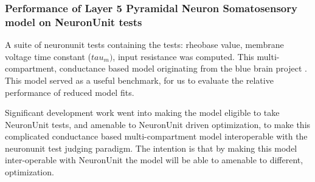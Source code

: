 



%


\subsubsection{Performance of Layer 5 Pyramidal Neuron Somatosensory model on NeuronUnit tests}
\cite{van2016bluepyopt}
A suite of neuronunit tests containing the tests: rheobase value, membrane voltage time constant ($tau_{m})$, input resistance was computed. This multi-compartment, conductance based model originating from the blue brain project \cite{markram2015reconstruction}. This model served as a useful benchmark, for us to evaluate the relative performance of reduced model fits. 


Significant development work went into making the model eligible to take NeuronUnit tests, and amenable to NeuronUnit driven optimization, to make this complicated conductance based multi-compartment model interoperable with the neuronunit test judging paradigm. The intention is that by making this model inter-operable with NeuronUnit the model will be able to amenable to different, optimization. 

